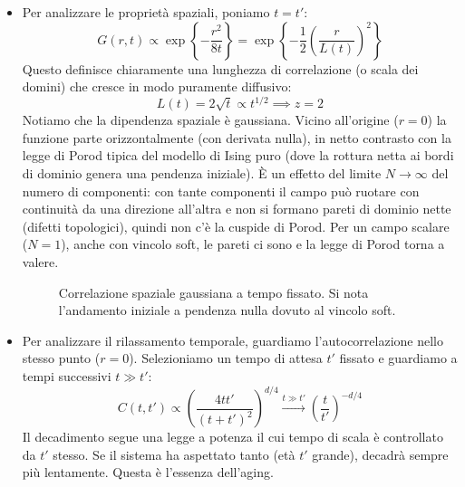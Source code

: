 \begin{itemize}
    \item  Per analizzare le proprietà spaziali, poniamo $t = t'$:
\begin{equation}
    G(r, t) \propto \exp\left\{ - \frac{r^2}{8t} \right\} = \exp\left\{ - \frac{1}{2} \left( \frac{r}{L(t)} \right)^2 \right\}
\end{equation}
Questo definisce chiaramente una lunghezza di correlazione (o scala dei domini) che cresce in modo puramente diffusivo:
\begin{equation}
    L(t) = 2 \sqrt{t} \propto t^{1/2} \implies z = 2
\end{equation}
Notiamo che la dipendenza spaziale è gaussiana. Vicino all'origine ($r=0$) la funzione parte orizzontalmente (con derivata nulla), in netto contrasto con la legge di Porod tipica del modello di Ising puro (dove la rottura netta ai bordi di dominio genera una pendenza iniziale). È un effetto del limite $N \to \infty$ del numero di componenti: con tante componenti il campo può ruotare con continuità da una direzione all'altra e non si formano pareti di dominio nette (difetti topologici), quindi non c'è la cuspide di Porod. Per un campo scalare ($N=1$), anche con vincolo soft, le pareti ci sono e la legge di Porod torna a valere.

\begin{figure}[H]
    \centering
    \caption{Correlazione spaziale gaussiana a tempo fissato. Si nota l'andamento iniziale a pendenza nulla dovuto al vincolo soft.}
\end{figure}

\item Per analizzare il rilassamento temporale, guardiamo l'autocorrelazione nello stesso punto ($r=0$). Selezioniamo un tempo di attesa $t'$ fissato e guardiamo a tempi successivi $t \gg t'$:
\begin{equation}
    C(t, t') \propto \left( \frac{4tt'}{(t+t')^2} \right)^{d/4} \xrightarrow{t \gg t'} \left( \frac{t}{t'} \right)^{-d/4}
\end{equation}
Il decadimento segue una legge a potenza il cui tempo di scala è controllato da $t'$ stesso. Se il sistema ha aspettato tanto (età $t'$ grande), decadrà sempre più lentamente. Questa è l'essenza dell'aging.
\end{itemize}

